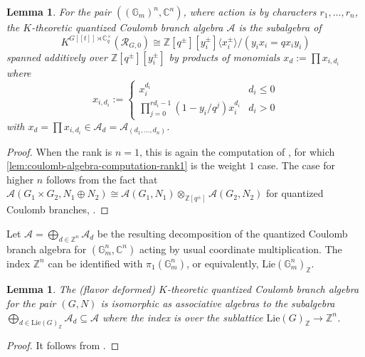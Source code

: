 \documentclass[reqno]{amsart}
\numberwithin{equation}{section}
\numberwithin{equation}{section}
\numberwithin{equation}{section}
\newtheorem{lemma}[thm]{Lemma}
\theoremstyle{definition}
\theoremstyle{remark}
\theoremstyle{remark}
\begin{document}
\begin{lemma}\label{lem:coulomb-algebra-computation}
For the pair $((\mathbb{G}_m)^n, \mathbb{C}^n)$, where action is by characters $r_1, \dots, r_n$, the $K$-theoretic quantized Coulomb branch algebra $\mathcal{A}$ is the subalgebra of
    \begin{equation}
        K^{G[\![t]\!] \rtimes \mathbb{C}^\times_q}(\mathcal{R}_{G, 0}) \cong \mathbb{Z}[q^\pm ][y_i^\pm]\langle x_i^\pm \rangle/(y_ix_i=qx_iy_i)
    \end{equation}
    spanned additively over $\mathbb{Z}[q^\pm][y^\pm_i]$ by products of monomials $x_d := \prod x_{i, d_i}$ where
    \begin{equation}
        x_{i,d_i} := \begin{cases}
            x^{d_i}_i & d_i \le 0 \\ \prod_{j=0}^{rd_i-1} (1-y_i/q^j) x^{d_i}_i & d_i >0 
        \end{cases}
    \end{equation}
    with $x_d = \prod x_{i,d_i} \in \mathcal{A}_{d} = \mathcal{A}_{(d_1, \dots, d_n)}$.    
\end{lemma}
\begin{proof}
    When the rank is $n=1$, this is again the computation of \cite[Example 4.4]{lonergan}, for which \cref{lem:coulomb-algebra-computation-rank1} is the weight $1$ case. The case for higher $n$ follows from the fact that $\mathcal{A}(G_1 \times G_2, N_1 \oplus N_2) \cong \mathcal{A}(G_1,N_1) \otimes_{\mathbb{Z}[q^\pm]}\mathcal{A}(G_2, N_2)$ for quantized Coulomb branches, \cite[3(vii)(a)]{BFN2}.
\end{proof}

Let $\mathcal{A} = \bigoplus_{d \in \mathbb{Z}^n} \mathcal{A}_d$ be the resulting decomposition of the quantized Coulomb branch algebra for $(\mathbb{G}_m^n, \mathbb{C}^n)$ acting by usual coordinate multiplication. The index $\mathbb{Z}^n$ can be identified with $\pi_1(\mathbb{G}_m^n)$, or equivalently, $\mathrm{Lie}(\mathbb{G}_m^n)_{\mathbb{Z}}$. 
\begin{lemma}
    The (flavor deformed) $K$-theoretic quantized Coulomb branch algebra for the pair $(G,N)$ is isomorphic as associative algebras to the subalgebra $\bigoplus_{d \in \mathrm{Lie}(G)_{\mathbb{Z}}} \mathcal{A}_d \subseteq \mathcal{A}$ where the index is over the sublattice $\mathrm{Lie}(G)_{\mathbb{Z}} \to \mathbb{Z}^n$.
\end{lemma}
\begin{proof}
    It follows from \cite[3(ix), 4(ii, vii)]{BFN2}. 
\end{proof}
\end{document}
